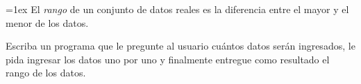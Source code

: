 \begin{minipage}[t]{.50\textwidth}
  \parskip=1ex
  El \emph{rango} de un conjunto de datos reales
  es la dife\-rencia entre el mayor y el menor de los datos.

  Escriba un programa que le pregunte al usuario
  cuántos datos serán ingresados,
  le pida ingresar los datos uno por uno
  y finalmente entregue como resultado
  el rango de los datos.
\end{minipage}
\hfill
\begin{minipage}[t]{.43\textwidth}
  
\end{minipage}

